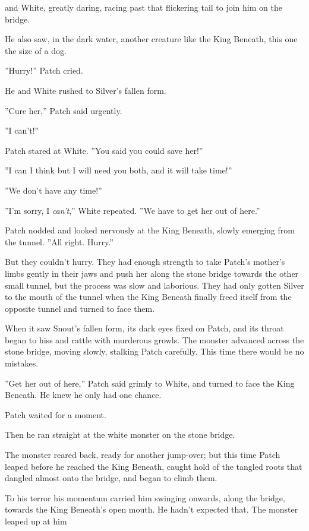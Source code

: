 \documentclass[11pt]{article}
\begin{document}
 and White, greatly daring, racing past that flickering tail to join him on the bridge.\par
He also saw, in the dark water, another creature like the King Beneath, this one the size of a dog.\par
''Hurry!'' Patch cried.\par
He and White rushed to Silver's fallen form.\par
''Cure her,'' Patch said urgently.\par
''I can't!''\par
Patch stared at White. ''You said you could save her!''\par
''I can %
 I think %
 but I will need you both, and it will take time!''\par
''We don't have any time!''\par
''I'm sorry, I {\it can't},'' White repeated. ''We have to get her out of here.''\par
 Patch nodded and looked nervously at the King Beneath, slowly emerging from the tunnel. ''All right. Hurry.''\par
 But they couldn't hurry. They had enough strength to take Patch's mother's limbs gently in their jaws and push her along the stone bridge towards the other small tunnel, but the process was slow and laborious. They had only gotten Silver to the mouth of the tunnel when the King Beneath finally freed itself from the opposite tunnel and turned to face them.\par
When it saw Snout's fallen form, its dark eyes fixed on Patch, and its throat began to hiss and rattle with murderous growls. The monster advanced across the stone bridge, moving slowly, stalking Patch carefully. This time there would be no mistakes.\par
 ''Get her out of here,'' Patch said grimly to White, and turned to face the King Beneath. He knew he only had one chance.\par
 Patch waited for a moment.\par
Then he ran straight at the white monster on the stone bridge.\par
The monster reared back, ready for another jump-over; but this time Patch leaped before he reached the King Beneath, caught hold of the tangled roots that dangled almost onto the bridge, and began to climb them.\par
To his terror his momentum carried him swinging onwards, along the bridge, towards the King Beneath's open mouth. He hadn't expected that. The monster leaped up at him %
\end{document}
